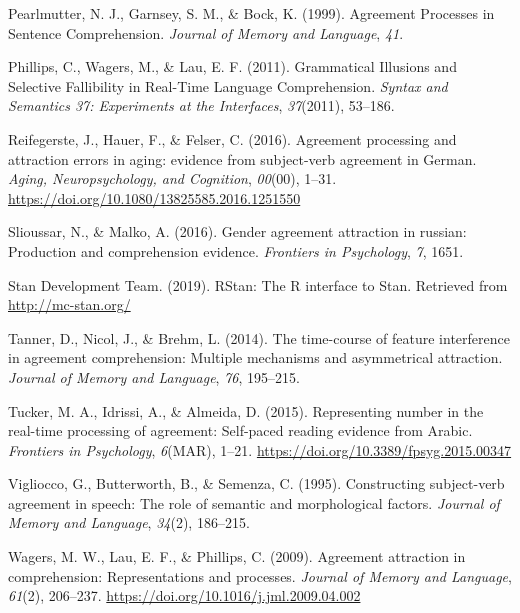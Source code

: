 \documentclass[
  english,
  doc,floatsintext]{apa6}
\newlength{\cslhangindent}
\newenvironment{cslreferences}%
  {\setlength{\parindent}{0pt}%
  \everypar{\setlength{\hangindent}{\cslhangindent}}\ignorespaces}%
  {\par}
\begin{document}
\begin{cslreferences}
\leavevmode\hypertarget{ref-PearlmutterGarnseyBock:1999}{}%
Pearlmutter, N. J., Garnsey, S. M., \& Bock, K. (1999). Agreement Processes in Sentence Comprehension. \emph{Journal of Memory and Language}, \emph{41}.

\leavevmode\hypertarget{ref-PhillipsEtAl:2011}{}%
Phillips, C., Wagers, M., \& Lau, E. F. (2011). Grammatical Illusions and Selective Fallibility in Real-Time Language Comprehension. \emph{Syntax and Semantics 37: Experiments at the Interfaces}, \emph{37}(2011), 53--186.

\leavevmode\hypertarget{ref-ReifegersteEtAl:2016}{}%
Reifegerste, J., Hauer, F., \& Felser, C. (2016). Agreement processing and attraction errors in aging: evidence from subject-verb agreement in German. \emph{Aging, Neuropsychology, and Cognition}, \emph{00}(00), 1--31. \url{https://doi.org/10.1080/13825585.2016.1251550}

\leavevmode\hypertarget{ref-Slioussar:2016}{}%
Slioussar, N., \& Malko, A. (2016). Gender agreement attraction in russian: Production and comprehension evidence. \emph{Frontiers in Psychology}, \emph{7}, 1651.

\leavevmode\hypertarget{ref-stan}{}%
Stan Development Team. (2019). RStan: The R interface to Stan. Retrieved from \url{http://mc-stan.org/}

\leavevmode\hypertarget{ref-TannerEtAl:2014}{}%
Tanner, D., Nicol, J., \& Brehm, L. (2014). The time-course of feature interference in agreement comprehension: Multiple mechanisms and asymmetrical attraction. \emph{Journal of Memory and Language}, \emph{76}, 195--215.

\leavevmode\hypertarget{ref-TuckerEtAl:2015}{}%
Tucker, M. A., Idrissi, A., \& Almeida, D. (2015). Representing number in the real-time processing of agreement: Self-paced reading evidence from Arabic. \emph{Frontiers in Psychology}, \emph{6}(MAR), 1--21. \url{https://doi.org/10.3389/fpsyg.2015.00347}

\leavevmode\hypertarget{ref-ViglioccoEtAl:1995}{}%
Vigliocco, G., Butterworth, B., \& Semenza, C. (1995). Constructing subject-verb agreement in speech: The role of semantic and morphological factors. \emph{Journal of Memory and Language}, \emph{34}(2), 186--215.

\leavevmode\hypertarget{ref-WagersEtAl:2009}{}%
Wagers, M. W., Lau, E. F., \& Phillips, C. (2009). Agreement attraction in comprehension: Representations and processes. \emph{Journal of Memory and Language}, \emph{61}(2), 206--237. \url{https://doi.org/10.1016/j.jml.2009.04.002}
\end{cslreferences}

\endgroup
\end{document}
